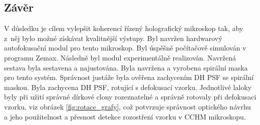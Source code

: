 \documentclass[12pt, a4paper, twoside]{article}
\begin{document}
\subsection*{Závěr}

V důsledku je cílem vylepšit koherencí řízený holografický mikroskop tak, aby z~něj bylo možné získávat kvalitnější výstupy. Byl navržen hardwarový autofokusační modul pro tento mikroskop. Byl úspěšně počítačově simulován v programu Zemax. Následně byl modul ex\-pe\-ri\-men\-tál\-ně realizován. Navržená sestava byla sestavena a najustována. Byla navržena a vyrobena spirální maska pro tento systém. Správnost justáže byla ověřena zachycením DH PSF se spirální maskou. Byla zachycena DH PSF, rotující s defokusací vzorku. Jednotlivé laloky byly při užití správné dírkové clony rozeznatelné a správně rotovaly při defokusaci vzorku, viz obrázek \ref{fig:rotace_grafy}, což potvrzuje správnost optického návrhu a jeho použitelnost a přesnost detekce rozostření vzorku v CCHM mikroskopu.
\end{document}
